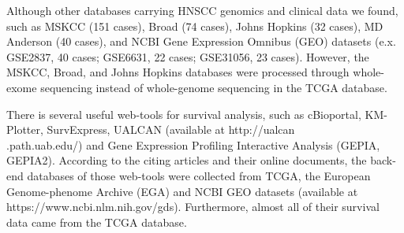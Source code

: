 \documentclass[preprint,12pt]{elsarticle}
\newenvironment{MyColorPar}[1]{%
    \leavevmode\color{#1}\ignorespaces%
}{%
}%
\begin{document}
\begin{MyColorPar}{blue}
Although other databases carrying HNSCC genomics and clinical data we found, such as MSKCC (151 cases), Broad (74 cases), Johns Hopkins (32 cases), MD Anderson (40 cases), and NCBI Gene Expression Omnibus (GEO) datasets (e.x. GSE2837, 40 cases; GSE6631, 22 cases; GSE31056, 23 cases)\cite{Cerami2012b}\cite{Gao2013a}. However, the MSKCC, Broad, and Johns Hopkins databases were processed through whole-exome sequencing instead of whole-genome sequencing in the TCGA database.

There is several useful web-tools for survival analysis, such as cBioportal\cite{Cerami2012b}\cite{Gao2013a}, KM-Plotter\cite{Gyorffy2010},  SurvExpress\cite{Aguirre-Gamboa2013}, UALCAN (available at http://ualcan\\.path.uab.edu/)\cite{Chandrashekar2017a} and Gene Expression Profiling Interactive Analysis (GEPIA, GEPIA2)\cite{Tang2019}. According to the citing articles\cite{Wu2020} and their online documents, the back-end databases of those web-tools were collected from TCGA, the European Genome-phenome Archive (EGA)\cite{Lappalainen2015} and NCBI GEO datasets (available at https://www.ncbi.nlm.nih.gov/gds). Furthermore, almost all of their survival data came from the TCGA database.



\end{MyColorPar}
\end{document}

